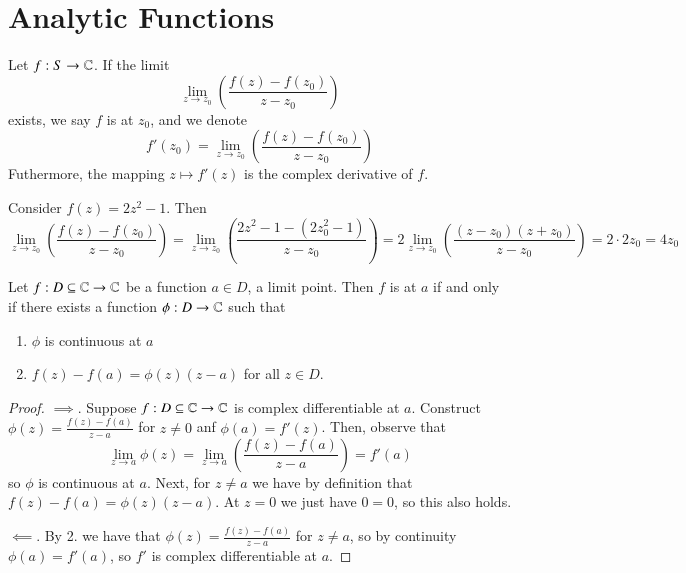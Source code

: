 \documentclass[12pt, a4paper, oneside, openright, titlepage]{book}
\begin{document}
\section{Analytic Functions}

\begin{defn}
    Let $f:S\rightarrow \mathbb C$. If the limit \begin{equation*}
        \lim\limits_{z\rightarrow z_0}\left(\frac{f(z) - f(z_0)}{z-z_0}\right)
    \end{equation*}
    exists, we say $f$ is  at $z_0$, and we denote \begin{equation*}
        f'(z_0) = \lim\limits_{z\rightarrow z_0}\left(\frac{f(z) - f(z_0)}{z-z_0}\right)
    \end{equation*}
    Futhermore, the mapping $z\mapsto f'(z)$ is the complex derivative of $f$.
\end{defn}

\begin{eg}
    Consider $f(z) = 2z^2 - 1$. Then \begin{equation*}
        \lim\limits_{z\rightarrow z_0}\left(\frac{f(z) - f(z_0)}{z-z_0}\right) = \lim\limits_{z\rightarrow z_0}\left(\frac{2z^2 - 1 - (2z_0^2 - 1)}{z-z_0}\right) = 2\lim\limits_{z\rightarrow z_0}\left(\frac{(z-z_0)(z+z_0)}{z-z_0}\right) = 2\cdot 2z_0 = 4z_0
    \end{equation*}
\end{eg}

\begin{namthm}\label{namthm:car}
    Let $f:D\subseteq \mathbb C\rightarrow \mathbb C$ be a function $a \in D$, a limit point. Then $f$ is  at $a$ if and only if there exists a function $\phi:D\rightarrow \mathbb C$ such that \begin{enumerate}
        \item $\phi$ is continuous at $a$
        \item $f(z)-f(a) = \phi(z)(z-a)$ for all $z \in D$.
    \end{enumerate}
\end{namthm}
\begin{proof}
    $\implies.$ Suppose $f:D\subseteq \mathbb C\rightarrow \mathbb C$ is complex differentiable at $a$. Construct $\phi(z) = \frac{f(z) - f(a)}{z-a}$ for $z \neq 0$ anf $\phi(a) = f'(z)$. Then, observe that \begin{equation*}
        \lim\limits_{z\rightarrow a}\phi(z) = \lim\limits_{z\rightarrow a}\left(\frac{f(z)-f(a)}{z-a}\right) = f'(a)
    \end{equation*}
    so $\phi$ is continuous at $a$. Next, for $z \neq a$ we have by definition that $f(z) - f(a) = \phi(z)(z-a)$. At $z = 0$ we just have $0 = 0$, so this also holds. 
    
    $\impliedby.$ By 2. we have that $\phi(z) = \frac{f(z) - f(a)}{z-a}$ for $z \neq a$, so by continuity $\phi(a) = f'(a)$, so $f'$ is complex differentiable at $a$.
\end{proof}
\end{document}
